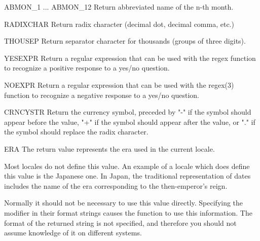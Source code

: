 \begin{datadesc}{ABMON_1 ... ABMON_12}
Return abbreviated name of the n-th month.
\end{datadesc}

\begin{datadesc}{RADIXCHAR}
Return radix character (decimal dot, decimal comma, etc.)
\end{datadesc}

\begin{datadesc}{THOUSEP}
Return separator character for thousands (groups of three digits).
\end{datadesc}

\begin{datadesc}{YESEXPR}
Return a regular expression that can be used with the regex
function to recognize a positive response to a yes/no question.
\end{datadesc}

\begin{datadesc}{NOEXPR}
Return a regular expression that can be used with the regex(3)
function to recognize a negative response to a yes/no question.
\end{datadesc}

\begin{datadesc}{CRNCYSTR}
Return the currency symbol, preceded by "-" if the symbol should
appear before the value, "+" if the symbol should appear after the
value, or "." if the symbol should replace the radix character.
\end{datadesc}

\begin{datadesc}{ERA}
The return value represents the era used in the current locale.

Most locales do not define this value.  An example of a locale which
does define this value is the Japanese one.  In Japan, the traditional
representation of dates includes the name of the era corresponding to
the then-emperor's reign.

Normally it should not be necessary to use this value directly.
Specifying the  modifier in their format strings causes the
 function to use this information.  The format of the
returned string is not specified, and therefore you should not assume
knowledge of it on different systems.
\end{datadesc}

